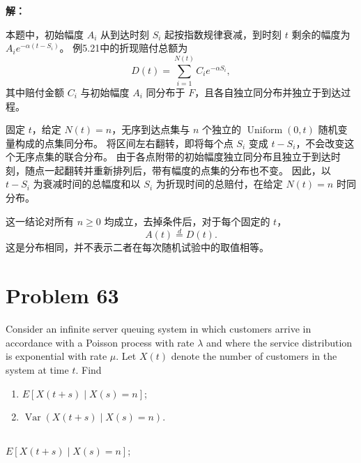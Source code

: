 \documentclass[12pt,a4paper]{article}
\begin{document}
\begin{answerbox}
\textbf{解：}

本题中，初始幅度 $A_i$ 从到达时刻 $S_i$ 起按指数规律衰减，到时刻 $t$ 剩余的幅度为 $A_i e^{-\alpha(t-S_i)}$。
例5.21中的折现赔付总额为
$$
D(t)=\sum_{i=1}^{N(t)}C_i e^{-\alpha S_i},
$$
其中赔付金额 $C_i$ 与初始幅度 $A_i$ 同分布于 $F$，且各自独立同分布并独立于到达过程。

固定 $t$，给定 $N(t)=n$，无序到达点集与 $n$ 个独立的 $\operatorname{Uniform}(0,t)$ 随机变量构成的点集同分布。
将区间左右翻转，即将每个点 $S_i$ 变成 $t-S_i$，不会改变这个无序点集的联合分布。
由于各点附带的初始幅度独立同分布且独立于到达时刻，随点一起翻转并重新排列后，带有幅度的点集的分布也不变。
因此，以 $t-S_i$ 为衰减时间的总幅度和以 $S_i$ 为折现时间的总赔付，在给定 $N(t)=n$ 时同分布。

这一结论对所有 $n\ge0$ 均成立，去掉条件后，对于每个固定的 $t$，
$$
A(t)\overset{d}{=}D(t).
$$
这是分布相同，并不表示二者在每次随机试验中的取值相等。
\end{answerbox}

\section{Problem 63}

Consider an infinite server queuing system in which customers arrive in accordance with a Poisson process with rate $\lambda$ and where the service distribution is exponential with rate $\mu$. Let $X(t)$ denote the number of customers in the system at time $t$. Find
\begin{enumerate}[label=(\alph*),leftmargin=2em]
  \item $E[X(t+s) \mid X(s)=n]$;
  \item $\operatorname{Var}(X(t+s) \mid X(s)=n)$.
\end{enumerate}


\subsection{}

$E[X(t+s) \mid X(s)=n]$;
\end{document}
